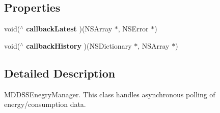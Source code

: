 \subsection*{Properties}
\begin{DoxyCompactItemize}
\item 
\hypertarget{interface_m_d_d_s_s_consumption_manager_a911f8a05a99ca741b5e36c59bab6f85f}{void($^\wedge$ {\bfseries callback\-Latest} )(N\-S\-Array $\ast$, N\-S\-Error $\ast$)}\label{interface_m_d_d_s_s_consumption_manager_a911f8a05a99ca741b5e36c59bab6f85f}

\item 
\hypertarget{interface_m_d_d_s_s_consumption_manager_a710c4c8abe3ecfb0555ae66cd7c0d938}{void($^\wedge$ {\bfseries callback\-History} )(N\-S\-Dictionary $\ast$, N\-S\-Array $\ast$)}\label{interface_m_d_d_s_s_consumption_manager_a710c4c8abe3ecfb0555ae66cd7c0d938}

\end{DoxyCompactItemize}


\subsection{Detailed Description}
M\-D\-D\-S\-S\-Enegry\-Manager. This class handles asynchronous polling of energy/consumption data. 

